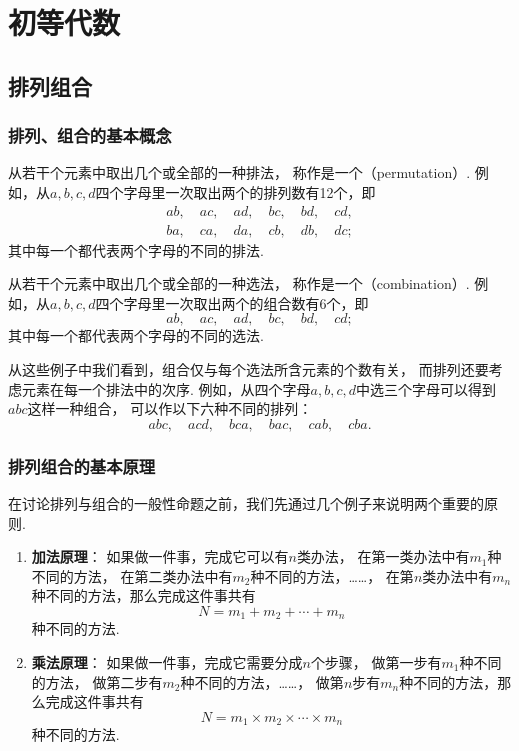 \chapter{初等代数}
\section{排列组合}
\subsection{排列、组合的基本概念}
从若干个元素中取出几个或全部的一种排法，
称作是一个（permutation）.
例如，从\(a,b,c,d\)四个字母里一次取出两个的排列数有12个，即\[
	\begin{gathered}
	ab, \quad
	ac, \quad
	ad, \quad
	bc, \quad
	bd, \quad
	cd, \\
	ba, \quad
	ca, \quad
	da, \quad
	cb, \quad
	db, \quad
	dc;
	\end{gathered}
\]
其中每一个都代表两个字母的不同的排法.

从若干个元素中取出几个或全部的一种选法，
称作是一个（combination）.
例如，从\(a,b,c,d\)四个字母里一次取出两个的组合数有6个，即\[
	ab, \quad
	ac, \quad
	ad, \quad
	bc, \quad
	bd, \quad
	cd;
\]
其中每一个都代表两个字母的不同的选法.

从这些例子中我们看到，组合仅与每个选法所含元素的个数有关，
而排列还要考虑元素在每一个排法中的次序.
例如，从四个字母\(a,b,c,d\)中选三个字母可以得到\(abc\)这样一种组合，
可以作以下六种不同的排列：\[
	abc, \quad
	acd, \quad
	bca, \quad
	bac, \quad
	cab, \quad
	cba.
\]

\subsection{排列组合的基本原理}
在讨论排列与组合的一般性命题之前，我们先通过几个例子来说明两个重要的原则.
\begin{enumerate}
	\item {\bf 加法原理}：
	如果做一件事，完成它可以有\(n\)类办法，
	在第一类办法中有\(m_1\)种不同的方法，
	在第二类办法中有\(m_2\)种不同的方法，……，
	在第\(n\)类办法中有\(m_n\)种不同的方法，那么完成这件事共有\[
	N = m_1 + m_2 + \dotsb + m_n
	\]种不同的方法.

	\item {\bf 乘法原理}：
	如果做一件事，完成它需要分成\(n\)个步骤，
	做第一步有\(m_1\)种不同的方法，
	做第二步有\(m_2\)种不同的方法，……，
	做第\(n\)步有\(m_n\)种不同的方法，那么完成这件事共有\[
	N = m_1 \times m_2 \times \dotsm \times m_n
	\]种不同的方法.
\end{enumerate}


